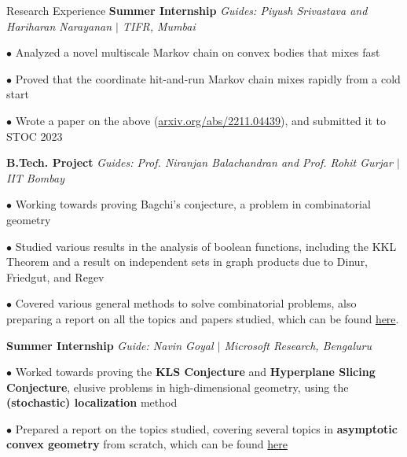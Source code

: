 \begin{rubric}{Research Experience}
    \entry*[2022] \textbf{Summer Internship} \hfill \emph{Guides: Piyush Srivastava and Hariharan Narayanan $\mid$ TIFR, Mumbai}

        $\bullet$ Analyzed a novel multiscale Markov chain on convex bodies that mixes fast

        $\bullet$ Proved that the coordinate hit-and-run Markov chain mixes rapidly from a cold start

        $\bullet$ Wrote a paper on the above (\href{https://arxiv.org/abs/2211.04439}{arxiv.org/abs/2211.04439}), and submitted it to STOC 2023

    \entry*[\phantom{.}2022] \textbf{B.Tech. Project} \hfill \emph{Guides: Prof. Niranjan Balachandran and Prof. Rohit Gurjar $\mid$ IIT Bombay}

        $\bullet$ Working towards proving Bagchi's conjecture, a problem in combinatorial geometry

        $\bullet$ Studied various results in the analysis of boolean functions, including the KKL Theorem and a result on independent sets in graph products due to Dinur, Friedgut, and Regev

        $\bullet$ Covered various general methods to solve combinatorial problems, also preparing a report on all the topics and papers studied, which can be found \href{https://amitrajaraman.github.io/research/pls/btp1-report.pdf}{here}.
    
    \entry*[2021] \textbf{Summer Internship} \hfill \emph{Guide: Navin Goyal $\mid$ Microsoft Research, Bengaluru}
        
        $\bullet$ Worked towards proving the \textbf{KLS Conjecture} and \textbf{Hyperplane Slicing Conjecture}, elusive problems in high-dimensional geometry, using the \textbf{(stochastic) localization} method

        $\bullet$ Prepared a report on the topics studied, covering several topics in \textbf{asymptotic convex geometry} from scratch, which can be found \href{https://amitrajaraman.github.io/notes/convex-geometry/main.pdf}{here}

\end{rubric}